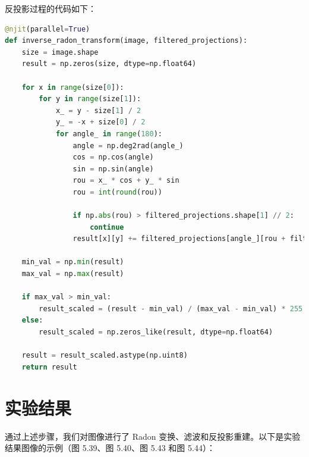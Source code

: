 \documentclass{article}
\begin{document}
反投影过程的代码如下：

\begin{lstlisting}[language=Python]
@njit(parallel=True)
def inverse_radon_transform(image, filtered_projections):
    size = image.shape
    result = np.zeros(size, dtype=np.float64)

    for x in range(size[0]):
        for y in range(size[1]):
            x_ = y - size[1] / 2
            y_ = -x + size[0] / 2
            for angle_ in range(180):
                angle = np.deg2rad(angle_)
                cos = np.cos(angle)
                sin = np.sin(angle)
                rou = x_ * cos + y_ * sin
                rou = int(round(rou))
                
                if np.abs(rou) > filtered_projections.shape[1] // 2:
                    continue
                result[x][y] += filtered_projections[angle_][rou + filtered_projections.shape[1] // 2 - 1]

    min_val = np.min(result)
    max_val = np.max(result)

    if max_val > min_val:
        result_scaled = (result - min_val) / (max_val - min_val) * 255
    else:
        result_scaled = np.zeros_like(result, dtype=np.float64)

    result = result_scaled.astype(np.uint8)
    return result
\end{lstlisting}

\section{实验结果}
通过上述步骤，我们对图像进行了 Radon 变换、滤波和反投影重建。以下是实验结果图像的示例（图 5.39、图 5.40、图 5.43 和图 5.44）：
\end{document}
